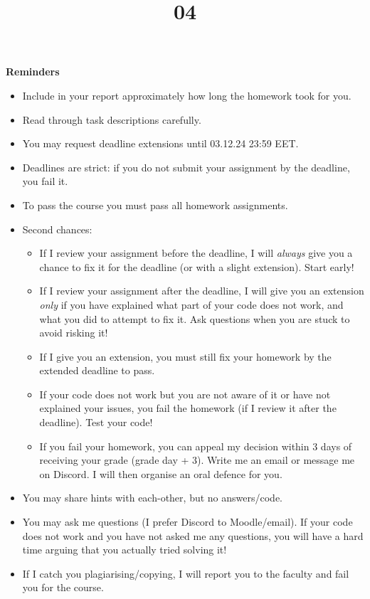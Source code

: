 \documentclass{homework}
\title{04}
\date{\DTMdate{2024-12-06}}
\begin{document}
\maketitle

\textbf{Reminders}

\begin{itemize}
  \item Include in your report approximately how long the homework took for you.
  \item Read through task descriptions carefully.
  \item You may request deadline extensions until 03.12.24 23:59 EET.
  \item Deadlines are strict: if you do not submit your assignment by the deadline, you fail it.
  \item To pass the course you must pass all homework assignments.
  \item Second chances:
  \begin{itemize}
    \item If I review your assignment before the deadline, I will \emph{always} give you a chance to fix it for the deadline (or with a slight extension).
    Start early!
    \item If I review your assignment after the deadline, I will give you an extension \emph{only} if you have explained what part of your code does not work, and what you did to attempt to fix it.
    Ask questions when you are stuck to avoid risking it!
    \item If I give you an extension, you must still fix your homework by the extended deadline to pass.
    \item If your code does not work but you are not aware of it or have not explained your issues, you fail the homework (if I review it after the deadline).
    Test your code!
    \item If you fail your homework, you can appeal my decision within 3 days of receiving your grade (grade day + 3).
    Write me an email or message me on Discord.
    I will then organise an oral defence for you.
  \end{itemize}
  \item You may share hints with each-other, but no answers/code.
  \item You may ask me questions (I prefer Discord to Moodle/email).
  If your code does not work and you have not asked me any questions, you will have a hard time arguing that you actually tried solving it!
  \item If I catch you plagiarising/copying, I will report you to the faculty and fail you for the course.
\end{itemize}
\end{document}
